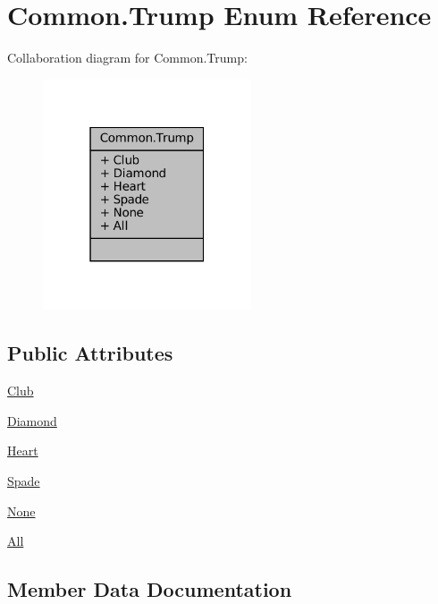 \hypertarget{enumCommon_1_1Trump}{}\section{Common.\+Trump Enum Reference}
\label{enumCommon_1_1Trump}


Collaboration diagram for Common.\+Trump\+:
\nopagebreak
\begin{figure}[H]
\begin{center}
\leavevmode
\includegraphics[width=175pt]{enumCommon_1_1Trump__coll__graph}
\end{center}
\end{figure}
\subsection*{Public Attributes}
\begin{DoxyCompactItemize}
\item 
\mbox{\hyperlink{enumCommon_1_1Trump_aee164ffde8617f4f2011e367654a1eb8}{Club}}
\item 
\mbox{\hyperlink{enumCommon_1_1Trump_aac37a10a3736871072f2140cf34bf005}{Diamond}}
\item 
\mbox{\hyperlink{enumCommon_1_1Trump_aaef41d318043744601bb46453e3c057b}{Heart}}
\item 
\mbox{\hyperlink{enumCommon_1_1Trump_aba8278b09c4e9056abd4925b97cd2c4e}{Spade}}
\item 
\mbox{\hyperlink{enumCommon_1_1Trump_a09b4c3eed60d78fb571f98562ad43974}{None}}
\item 
\mbox{\hyperlink{enumCommon_1_1Trump_aaa822bc4e58a7e5e2553a57e0dcb8a7e}{All}}
\end{DoxyCompactItemize}


\subsection{Member Data Documentation}
\mbox{\label{enumCommon_1_1Trump_aaa822bc4e58a7e5e2553a57e0dcb8a7e}} 
